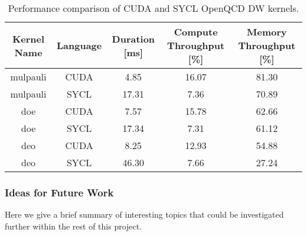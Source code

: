 \begin{center}
	\begin{table}
		\begin{tabular}{||c c c c c||}
			\hline
			Kernel Name & Language & Duration [ms] & Compute Throughput [\%] & Memory Throughput [\%] \\
			\hline\hline
			mulpauli    & CUDA     & 4.85          & 16.07                   & 81.30                  \\
			\hline
			mulpauli    & SYCL     & 17.31         & 7.36                    & 70.89                  \\
			\hline
			doe         & CUDA     & 7.57          & 15.78                   & 62.66                  \\
			\hline
			doe         & SYCL     & 17.34         & 7.31                    & 61.12                  \\
			\hline
			deo         & CUDA     & 8.25          & 12.93                   & 54.88                  \\
			\hline
			deo         & SYCL     & 46.30         & 7.66                    & 27.24                  \\
			\hline
		\end{tabular}
		\caption{\label{tab:openqcd_perf}Performance comparison of CUDA and SYCL OpenQCD DW kernels.}
	\end{table}
\end{center}


\subsubsection{Ideas for Future Work}\label{sec:openqcd_future_work}

Here we give a brief summary of interesting topics that could be investigated further within the rest of this project.

